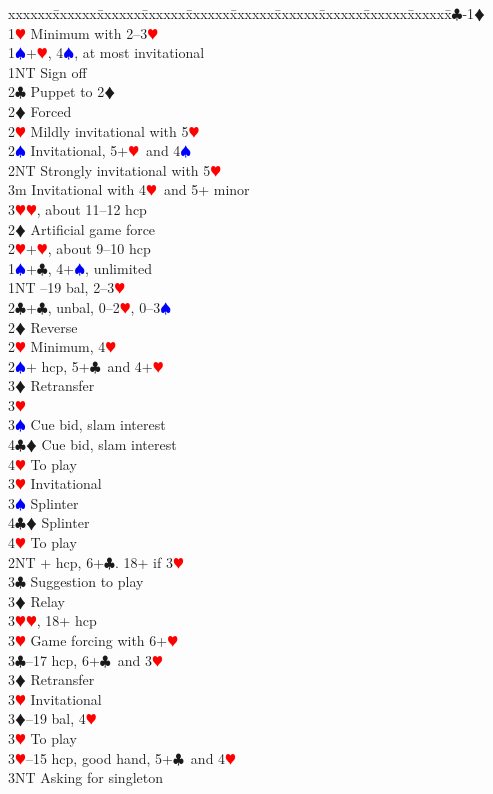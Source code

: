 \documentclass[a4paper]{article}
\newcommand{\BC}{\textcolor{OliveGreen}{$\clubsuit$}}
\newcommand{\BD}{\textcolor{RedOrange}{$\vardiamondsuit$}}
\newcommand{\BH}{\textcolor{Red}{$\varheartsuit${}}}
\newcommand{\BS}{\textcolor{Blue}{$\spadesuit${}}}
\newenvironment{bidtable}
{\begin{tabbing}

xxxxxx\=xxxxxx\=xxxxxx\=xxxxxx\=xxxxxx\=xxxxxx\=xxxxxx\=xxxxxx\=xxxxxx\=xxxxxx\=\kill}
{\end{tabbing} }%
\begin{document}
\begin{bidtable}
1\BC-1\BD\+\\
1\BH \> Minimum with 2--3\BH \+\\
1\BS {}+\BH , 4\BS , at most invitational\\
1NT \> Sign off\\
2\BC \> Puppet to 2\BD \+\\
2\BD \> Forced\+\\
2\BH \> Mildly invitational with 5\BH \\
2\BS \> Invitational, 5+\BH\ and 4\BS \\
2NT \> Strongly invitational with 5\BH \\
3m \> Invitational with 4\BH\ and 5+ minor\\
3\BH {}\BH , about 11--12 hcp\-\-\\
2\BD \> Artificial game force\\
2\BH {}+\BH , about 9--10 hcp\-\\
1\BS {}+\BC , 4+\BS , unlimited\\
1NT --19 bal, 2--3\BH \\
2\BC {}+\BC , unbal, 0--2\BH , 0--3\BS \\
2\BD \> Reverse\\
2\BH \> Minimum, 4\BH \\
2\BS {}+ hcp, 5+\BC\ and 4+\BH \+\\
3\BD \> Retransfer\+\\
3\BH\+\\
3\BS \> Cue bid, slam interest\\
4\BC\BD \> Cue bid, slam interest\\
4\BH \> To play\-\-\\
3\BH \> Invitational\\
3\BS \> Splinter\\
4\BC\BD \> Splinter\\
4\BH \> To play\-\\
2NT + hcp, 6+\BC . 18+ if 3\BH \+\\
3\BC \> Suggestion to play\\
3\BD \> Relay\+\\
3\BH {}\BH , 18+ hcp\-\\
3\BH \> Game forcing with 6+\BH \-\\
3\BC {}--17 hcp, 6+\BC\ and 3\BH \+\\
3\BD \> Retransfer\\
3\BH \> Invitational\-\\
3\BD {}--19 bal, 4\BH \+\\
3\BH \> To play\-\\
3\BH {}--15 hcp, good hand, 5+\BC\ and 4\BH \+\\
3NT \> Asking for singleton\-\-
\end{bidtable}
\end{document}
